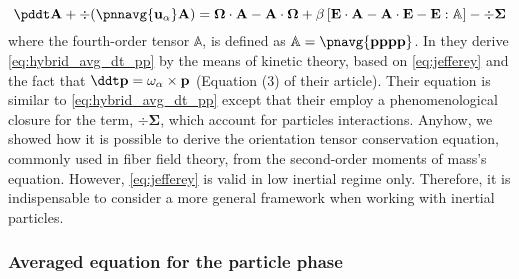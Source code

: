 \begin{equation}
    \pddt \textbf{A}
    + \div (
        \pnnavg{\textbf{u}_\alpha}\textbf{A}
    )
    =
    \mathbf{\Omega} \cdot \textbf{A}
    - \textbf{A} \cdot \mathbf{\Omega}
    + \beta\left[
        \textbf{E} \cdot \textbf{A}
        -\textbf{A} \cdot \textbf{E}
        - \textbf{E} : \mathbb{A}
    \right]
    - \div \mathbf{\Sigma}
    \label{eq:hybrid_avg_dt_pp}
\end{equation}
where the fourth-order tensor $\mathbb{A}$, is defined as $\mathbb{A} = \pnavg{\textbf{pppp}}$.
In \citet{wang2008objective} they derive \ref{eq:hybrid_avg_dt_pp} by the means of kinetic theory, based on \ref{eq:jefferey} and the fact that $\ddt \textbf{p} = \omega_\alpha \times \textbf{p}$ (Equation (3) of their article).
Their equation is similar to \ref{eq:hybrid_avg_dt_pp} except that their employ a phenomenological closure for the term, $\div \mathbf{\Sigma}$, which account for particles interactions.
Anyhow, we showed how it is possible to derive the orientation tensor conservation equation, commonly used in fiber field theory, from the second-order moments of mass's equation. 
However, \ref{eq:jefferey} is valid in low inertial regime only. 
Therefore, it is indispensable to consider a more general framework when working with inertial particles. 

\subsubsection{Averaged equation for the particle phase}

